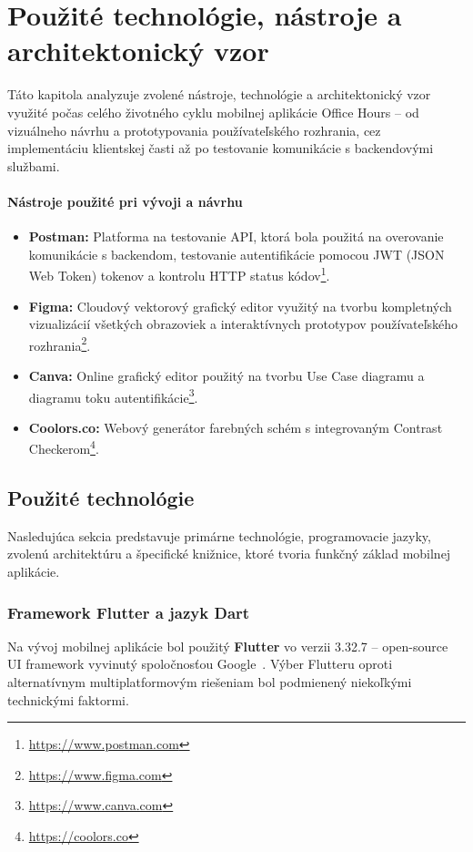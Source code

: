\chapter{Použité technológie, nástroje a architektonický vzor}\label{chap:technologie}
Táto kapitola analyzuje zvolené nástroje, technológie a architektonický vzor využité počas celého životného cyklu mobilnej aplikácie Office Hours – od vizuálneho návrhu a prototypovania používateľského rozhrania, cez implementáciu klientskej časti až po testovanie komunikácie s backendovými službami.

\subsubsection{Nástroje použité pri vývoji a návrhu}
\begin{itemize}
    \item \textbf{Postman:} Platforma na testovanie API, ktorá bola použitá na overovanie komunikácie s backendom, testovanie autentifikácie pomocou JWT (JSON Web Token) tokenov a kontrolu HTTP status kódov\footnote{\url{https://www.postman.com}}.

    \item \textbf{Figma:} Cloudový vektorový grafický editor využitý na tvorbu kompletných vizualizácií všetkých obrazoviek a interaktívnych prototypov používateľského rozhrania\footnote{\url{https://www.figma.com}}.

    \item \textbf{Canva:} Online grafický editor použitý na tvorbu Use Case diagramu a diagramu toku autentifikácie\footnote{\url{https://www.canva.com}}.

    \item \textbf{Coolors.co:} Webový generátor farebných schém s integrovaným Contrast Checkerom\footnote{\url{https://coolors.co}}.
\end{itemize}
\section{Použité technológie}
Nasledujúca sekcia predstavuje primárne technológie, programovacie jazyky, zvolenú architektúru a špecifické knižnice, ktoré tvoria funkčný základ mobilnej aplikácie.
\subsection{Framework Flutter a jazyk Dart}
Na vývoj mobilnej aplikácie bol použitý \textbf{Flutter} vo verzii 3.32.7 – open-source UI framework vyvinutý spoločnosťou Google~\cite{flutter}. Výber Flutteru oproti alternatívnym multiplatformovým riešeniam bol podmienený niekoľkými technickými faktormi.

